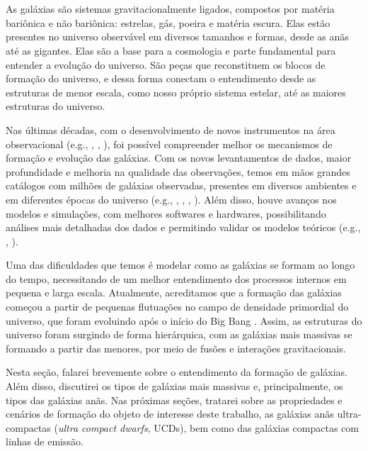 \setcounter{page}{0}
\chapter{\chapternameintro} \label{introduction}

As galáxias são sistemas gravitacionalmente ligados, compostos por matéria bariônica e não bariônica: estrelas, gás, poeira e matéria escura. Elas estão presentes no universo observável em diversos tamanhos e formas, desde as anãs até as gigantes. Elas são a base para a cosmologia e parte fundamental para entender a evolução do universo. São peças que reconstituem os blocos de formação do universo, e dessa forma conectam o entendimento desde as estruturas de menor escala, como nosso próprio sistema estelar, até as maiores estruturas do universo.

Nas últimas décadas, com o desenvolvimento de novos instrumentos na área observacional (e.g., \citealp{hubble_classification_1926},  \citealp{JWT_2006}, \citealp{VLT_2010}), foi possível compreender melhor os mecanismos de formação e evolução das galáxias. Com os novos levantamentos de dados, maior profundidade e melhoria na qualidade das observações, temos em mãos grandes catálogos com milhões de galáxias observadas, presentes em diversos ambientes e em diferentes épocas do universo (e.g., \citealp{SDSS_2000}, \citealp{COSMOS_2007}, \citealp{DES_2018}, \citealp{oliveira2019splus}). Além disso, houve avanços nos modelos e simulações, com melhores softwares e hardwares, possibilitando análises mais detalhadas dos dados e permitindo validar os modelos teóricos (e.g., \citealp{Vogelsberger_2014}, \citealp{EAGLE_2015}).

Uma das dificuldades que temos é modelar como as galáxias se formam ao longo do tempo, necessitando de um melhor entendimento dos processos internos em pequena e larga escala. Atualmente, acreditamos que a formação das galáxias começou a partir de pequenas flutuações no campo de densidade primordial do universo, que foram evoluindo após o início do Big Bang \citep{liddle_1999}. Assim, as estruturas do universo foram surgindo de forma hierárquica, com as galáxias mais massivas se formando a partir das menores, por meio de fusões e interações gravitacionais.

Nesta seção, falarei brevemente sobre o entendimento da formação de galáxias. Além disso, discutirei os tipos de galáxias mais massivas e, principalmente, os tipos das galáxias anãs. Nas próximas seções, tratarei sobre as propriedades e cenários de formação do objeto de interesse deste trabalho, as galáxias anãs ultra-compactas ({\it ultra compact dwarfs}, UCDs), bem como das galáxias compactas com linhas de emissão.

